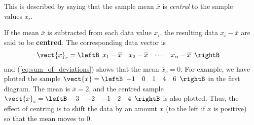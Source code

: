 \begin{wrapfigure}[9]{l}{5cm} 
\vspace*{-5em}
\centering

\vspace{1em}

\end{wrapfigure}
This is described by saying that the sample mean $\overline{x}$ is \textit{central} to the sample values $x_{i}$.

If the mean $\overline{x}$ is subtracted from each data value $x_{i}$, the resulting data $x_{i} - \overline{x}$ are said to be \textbf{centred}. The corresponding data vector is
\begin{equation*}
\vect{x}_c = 
\leftB \begin{array}{cccc}
x_1 - \overline{x} &
x_2 - \overline{x} &
\cdots &
x_n - \overline{x} 
\end{array} \rightB
\end{equation*}
and (\ref{eq:sum_of_deviations}) shows that the mean $\overline{x}_c = 0$. For example, we have plotted the sample $\vect{x} =
\leftB \begin{array}{ccccc}
-1 & 0 & 1 & 4 & 6
\end{array} \rightB$ in the first diagram. The mean is $\overline{x} = 2$, and the centred sample $\vect{x}_{c} = 
\leftB \begin{array}{ccccc}
-3 & -2 & -1 & 2 & 4
\end{array} \rightB$ is also plotted. Thus, the effect of centring is to shift the data by an amount $\overline{x}$ (to the left if $\overline{x}$ is positive) so that the mean moves to $0$.

